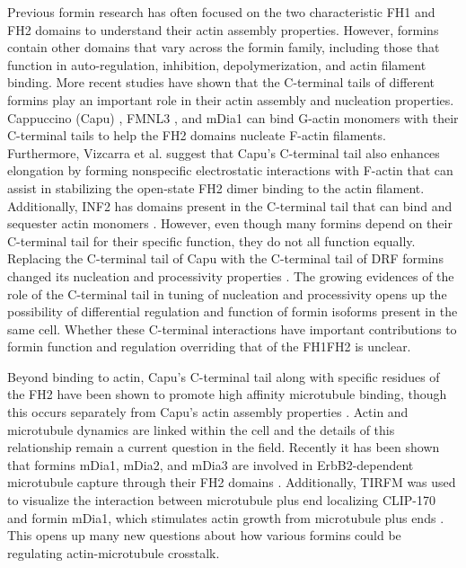 Previous formin research has often focused on the two characteristic FH1 and FH2 domains to understand their actin assembly properties. However, formins contain other domains that vary across the formin family, including those that function in auto-regulation, inhibition, depolymerization, and actin filament binding. More recent studies have shown that the C-terminal tails of different formins play an important role in their actin assembly and nucleation properties. Cappuccino (Capu) \citep{vizcarra_role_2014}, FMNL3 \citep{heimsath_c_2012}, and mDia1 \citep{gould_formin_2011} can bind G-actin monomers with their C-terminal tails to help the FH2 domains nucleate F-actin filaments. Furthermore, Vizcarra et al. suggest that Capu's C-terminal tail also enhances elongation by forming nonspecific electrostatic interactions with F-actin that can assist in stabilizing the open-state FH2 dimer binding to the actin filament. Additionally, INF2 has domains present in the C-terminal tail that can bind and sequester actin monomers \citep{chhabra_inf2_2006}. However, even though many formins depend on their C-terminal tail for their specific function, they do not all function equally. Replacing the C-terminal tail of Capu with the C-terminal tail of DRF formins changed its nucleation and processivity properties \citep{vizcarra_role_2014}. The growing evidences of the role of the C-terminal tail in tuning of nucleation and processivity opens up the possibility of differential regulation and function of formin isoforms present in the same cell. Whether these C-terminal interactions have important contributions to formin function and regulation overriding that of the FH1FH2 is unclear. 

Beyond binding to actin, Capu's C-terminal tail along with specific residues of the FH2 have been shown to promote high affinity microtubule binding, though this occurs separately from Capu's actin assembly properties \citep{roth-johnson_interaction_2014}. Actin and microtubule dynamics are linked within the cell and the details of this relationship remain a current question in the field. Recently it has been shown that formins mDia1, mDia2, and mDia3 are involved in ErbB2-dependent microtubule capture through their FH2 domains \citep{daou_essential_2014}. Additionally, TIRFM was used to visualize the interaction between microtubule plus end localizing CLIP-170 and formin mDia1, which stimulates actin growth from microtubule plus ends \citep{henty-ridilla_accelerated_2016}. This opens up many new questions about how various formins could be regulating actin-microtubule crosstalk. 

